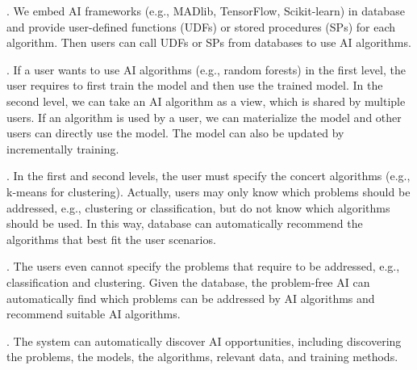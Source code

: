 . We embed AI frameworks (e.g., MADlib, TensorFlow, Scikit-learn) in database and provide user-defined functions (UDFs) or stored procedures (SPs) for each algorithm. Then users can call UDFs or SPs from databases to use AI algorithms. 

. If a user wants to use AI algorithms (e.g., random forests) in the first level, the user requires to first train the model and then use the trained model. In the second level, we can take an AI algorithm as a view, which is shared by multiple users. If an algorithm is used by a user, we can materialize the model and other users can directly use the model. The model can also be updated by incrementally training. 



. In the first and second levels, the user must specify the concert algorithms (e.g., k-means for clustering). Actually, users may only know which problems should be addressed, e.g., clustering or classification, but do not know which algorithms should be used. In this way, database can automatically recommend the algorithms that best fit the user scenarios.


. The users even cannot specify the problems that require to be addressed, e.g., classification and clustering. Given the database, the problem-free AI can automatically find which problems can be addressed by AI algorithms and recommend suitable AI algorithms. 

. The system can automatically discover AI opportunities, including discovering the problems, the models, the algorithms, relevant data,  and training methods.  

